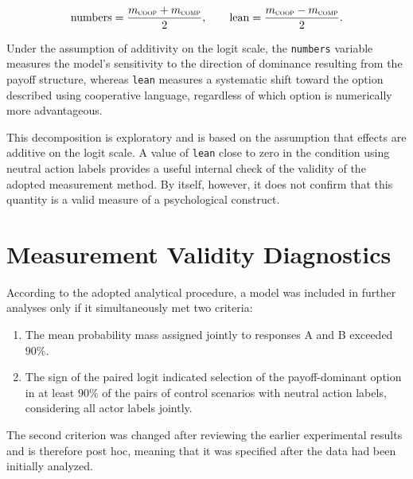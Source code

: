 \documentclass[11pt]{article}
\newcommand{\comp}{\textsc{comp}}
\newcommand{\coop}{\textsc{coop}}
\begin{document}
\begin{equation}
\text{numbers}=\frac{m_{\coop}+m_{\comp}}{2},\qquad
\text{lean}=\frac{m_{\coop}-m_{\comp}}{2}.
\end{equation}

Under the assumption of additivity on the logit scale, the \texttt{numbers} variable measures the model's sensitivity to the direction of dominance resulting from the payoff structure, whereas \texttt{lean} measures a systematic shift toward the option described using cooperative language, regardless of which option is numerically more advantageous.

This decomposition is exploratory and is based on the assumption that effects are additive on the logit scale. A value of \texttt{lean} close to zero in the condition using neutral action labels provides a useful internal check of the validity of the adopted measurement method. By itself, however, it does not confirm that this quantity is a valid measure of a psychological construct.

\section{Measurement Validity Diagnostics}
According to the adopted analytical procedure, a model was included in further analyses only if it simultaneously met two criteria:

\begin{enumerate}
\item The mean probability mass assigned jointly to responses A and B exceeded $90\%$.
\item The sign of the paired logit indicated selection of the payoff-dominant option in at least $90\%$ of the pairs of control scenarios with neutral action labels, considering all actor labels jointly.
\end{enumerate}

The second criterion was changed after reviewing the earlier experimental results and is therefore post hoc, meaning that it was specified after the data had been initially analyzed.
\end{document}
